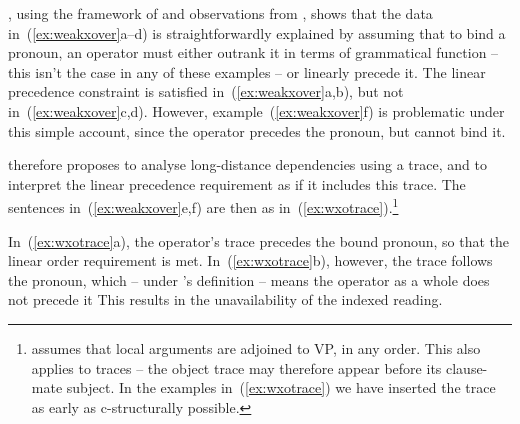 \documentclass[output=paper,hidelinks]{langscibook}
\begin{document}
\citet{Berman2003}, using the framework of \citet{Bresnan1998} and
observations from \citet{choi:1995:lsa}, shows that the data
in~(\ref{ex:weakxover}a--d) is straightforwardly explained by assuming that to
bind a pronoun, an operator must either outrank it in terms of
grammatical function -- this isn't the case in any of these examples
-- or linearly precede it. The linear precedence constraint is
satisfied in~(\ref{ex:weakxover}a,b), but not in~(\ref{ex:weakxover}c,d). However,
example~(\ref{ex:weakxover}f) is problematic under this simple account, since the
operator precedes the pronoun, but cannot bind it.

\hspace*{-3.8pt}\citeauthor{Berman2003} therefore proposes to analyse long-distance
dependencies using a trace, and to interpret the linear precedence
requirement as if it includes this trace. The sentences in~(\ref{ex:weakxover}e,f)
are then as in~(\ref{ex:wxotrace}).\footnote{\citet{Berman2003} assumes that
local arguments are adjoined to VP, in any order. This also applies to
traces -- the object trace may therefore appear before its clause-mate
subject. In the examples in~(\ref{ex:wxotrace}) we have inserted the
trace as early as c-structurally possible.}
%
\begin{exe}
  \ex\label{ex:wxotrace}
  \begin{xlist}
  \end{xlist}
\end{exe}
%
In~(\ref{ex:wxotrace}a), the operator's trace precedes the bound pronoun, so
that the linear order requirement is met. In~(\ref{ex:wxotrace}b), however, the trace follows the pronoun, which -- under \citeauthor{Berman2003}'s definition -- means the operator as a whole does not precede it
This results in the unavailability of the indexed reading.
\end{document}
